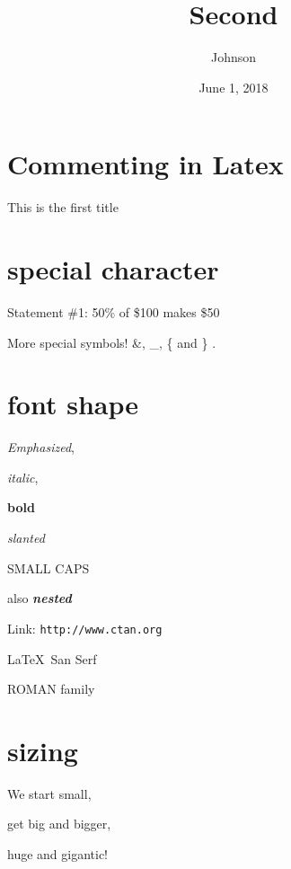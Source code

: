 \documentclass[a4paper,12pt]{article}
\begin{document}
\title{Second}
\author{Johnson}
\date{June 1, 2018}
\maketitle
\section{Commenting in Latex}
This is the first title



\section{special character}
Statement \#1:
50\% of \$100 makes \$50

More special symbols! \&, \_, \{ and \} .

\section{font shape}
\emph{Emphasized}, 

\textit{italic}, 

\textbf{bold}

\textsl{slanted}

\textsc{SMALL CAPS}

also \textbf{\textit{nested}}

Link: \texttt{http://www.ctan.org}

\textsf{\LaTeX\ San Serf}

\textrm{ROMAN family}

\section{sizing}

\noindent\tiny We \scriptsize start \footnotesize \small small,

\normalsize get \large big \Large and \LARGE bigger,

\huge huge and \Huge gigantic!
\end{document}
